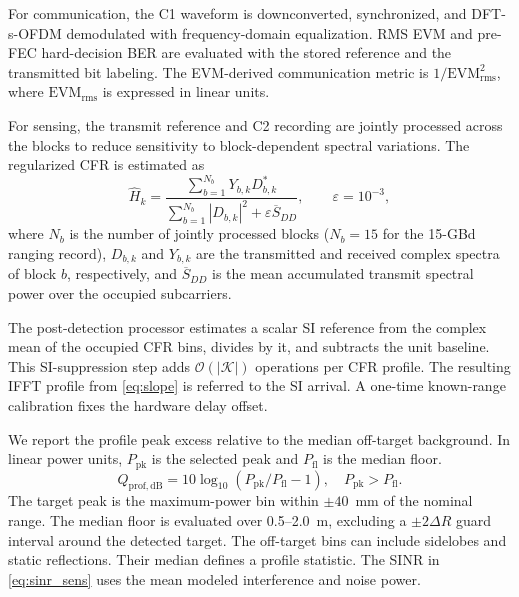 \documentclass[10pt,journal]{IEEEtran}
\DeclareRobustCommand{\rev}[1]{\textcolor{revisioncolor}{#1}}
\begin{document}
For communication, the C1 waveform is downconverted, synchronized, and
DFT-s-OFDM demodulated with frequency-domain equalization. \rev{RMS EVM and pre-FEC hard-decision BER are evaluated with the
stored reference and the transmitted bit labeling. The
EVM-derived communication metric is
\(1/\mathrm{EVM}_{\mathrm{rms}}^2\), where
\(\mathrm{EVM}_{\mathrm{rms}}\) is expressed in linear units.}

For sensing, the transmit reference and C2 recording are jointly
processed across the blocks to reduce sensitivity to block-dependent
spectral variations. The regularized CFR is estimated as
\begin{equation}
\widehat H_k=
\frac{\sum_{b=1}^{N_b}Y_{b,k}D_{b,k}^{*}}
{\sum_{b=1}^{N_b}|D_{b,k}|^2+\varepsilon\overline S_{DD}},
\qquad \varepsilon=10^{-3},
\label{eq:cfr_reg}
\end{equation}
where \rev{\(N_b\) is the number of jointly processed
blocks (\(N_b=15\) for the 15-GBd ranging record),}
$D_{b,k}$ and $Y_{b,k}$ are the transmitted and received complex
spectra of block $b$, respectively, and $\overline S_{DD}$ is the
mean accumulated transmit spectral power over the occupied subcarriers.

\rev{The post-detection processor estimates a scalar SI reference
from the complex mean of the occupied CFR bins, divides by it,
and subtracts the unit baseline. This SI-suppression step adds
\(\mathcal O(|\mathcal K|)\) operations per CFR profile. The resulting IFFT profile
from \eqref{eq:slope} is referred to the SI arrival. A one-time
known-range calibration fixes the hardware delay offset.}

\rev{We report the profile peak excess relative to the median
off-target background. In linear power units, \(P_{\mathrm{pk}}\)
is the selected peak and \(P_{\mathrm{fl}}\) is the median floor.}
{\color{revisioncolor}
\begin{equation}
Q_{\mathrm{prof,dB}}=
10\log_{10}\!\left(P_{\mathrm{pk}}/P_{\mathrm{fl}}-1\right),
\quad P_{\mathrm{pk}}>P_{\mathrm{fl}}.
\label{eq:sinr_profile}
\end{equation}}
The target peak is the maximum-power bin within $\pm40$~mm of the
nominal range. The median floor is evaluated over 0.5--2.0~m,
excluding a $\pm2\Delta R$ guard interval around the detected target.
\rev{The off-target bins can include sidelobes and static reflections.
Their median defines a profile statistic. The SINR in
\eqref{eq:sinr_sens} uses the mean modeled interference and
noise power.}
\end{document}
